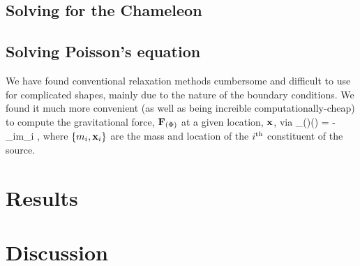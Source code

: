 \documentclass[amsmath,amssymb,10pt,eqsecnum, twocolumn]{revtex4}
\begin{document}
\subsection{Solving for the Chameleon}
\subsection{Solving Poisson's equation}
We have found conventional relaxation methods cumbersome and difficult to use for complicated shapes, mainly due to the nature of the boundary conditions. We found it much more convenient (as well as being increible computationally-cheap) to compute  the gravitational force, ${\bf{F}}_{(\Phi)}$ at a given location, ${\bf{x}}$, via
\bea
{}_{(\Phi)}() = - \sum_{i}m_i ,
\eea
where $\{m_i,{\bf{x}}_i\}$ are the mass and location of the ${i}^{\scriptsize{\textrm{th}}}$ constituent of the source.
\section{Results}

\section{Discussion}
\end{document}

